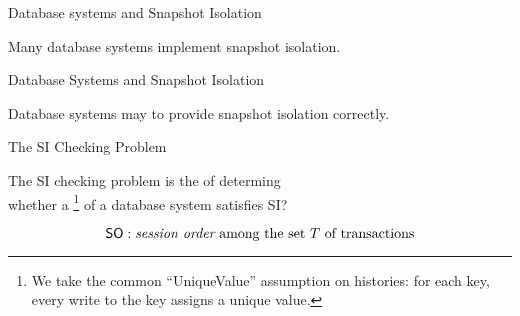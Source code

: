 
\begin{frame}{Database systems and Snapshot Isolation}
  \begin{center}
    Many database systems implement snapshot isolation.

    \vspace{0.30cm}
  \end{center}
\end{frame}

\begin{frame}{Database Systems and Snapshot Isolation}
  \begin{center}
    Database systems may  to provide snapshot isolation correctly.

    \vspace{0.30cm}
  \end{center}
\end{frame}

\begin{frame}{The SI Checking Problem}
  \begin{definition}
    The SI checking problem is the  of determing \\[5pt]
    whether a \footnote{
      We take the common ``UniqueValue'' assumption on histories:
      for each key, every write to the key assigns a unique value.
    } of a database system satisfies SI?
  \end{definition}


  \vspace{-0.50cm}
  \[
    \textup{\textsf{SO}}: \text{{\it session order} among the set $T$ of transactions}
  \]
\end{frame}

